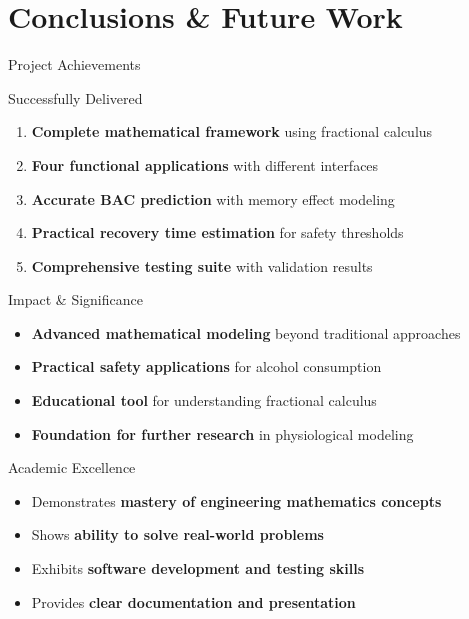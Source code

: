 \documentclass[aspectratio=169]{beamer}
\newcommand{\highlight}[1]{\textcolor{kentech_orange}{\textbf{#1}}}
\begin{document}
\section{Conclusions \& Future Work}

\begin{frame}{Project Achievements}
    \begin{block}{Successfully Delivered}
        \begin{enumerate}
            \item \highlight{Complete mathematical framework} using fractional calculus
            \item \highlight{Four functional applications} with different interfaces
            \item \highlight{Accurate BAC prediction} with memory effect modeling
            \item \highlight{Practical recovery time estimation} for safety thresholds
            \item \highlight{Comprehensive testing suite} with validation results
        \end{enumerate}
    \end{block}
    
    \begin{block}{Impact \& Significance}
        \begin{itemize}
            \item \highlight{Advanced mathematical modeling} beyond traditional approaches
            \item \highlight{Practical safety applications} for alcohol consumption
            \item \highlight{Educational tool} for understanding fractional calculus
            \item \highlight{Foundation for further research} in physiological modeling
        \end{itemize}
    \end{block}
    
    \begin{block}{Academic Excellence}
        \begin{itemize}
            \item Demonstrates \highlight{mastery of engineering mathematics concepts}
            \item Shows \highlight{ability to solve real-world problems}
            \item Exhibits \highlight{software development and testing skills}
            \item Provides \highlight{clear documentation and presentation}
        \end{itemize}
    \end{block}
\end{frame}
\end{document}
